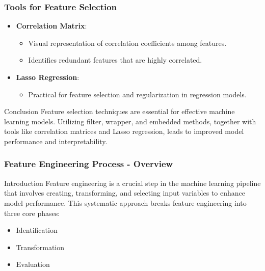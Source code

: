 \documentclass[aspectratio=169]{beamer}
\begin{document}
\begin{frame}[fragile]
    \frametitle{Tools for Feature Selection}
    \begin{itemize}
        \item \textbf{Correlation Matrix}:
            \begin{itemize}
                \item Visual representation of correlation coefficients among features.
                \item Identifies redundant features that are highly correlated.
            \end{itemize}
        
        \item \textbf{Lasso Regression}:
            \begin{itemize}
                \item Practical for feature selection and regularization in regression models.
            \end{itemize}
    \end{itemize}

    \begin{block}{Conclusion}
        Feature selection techniques are essential for effective machine learning models. Utilizing filter, wrapper, and embedded methods, together with tools like correlation matrices and Lasso regression, leads to improved model performance and interpretability.
    \end{block}
\end{frame}

\begin{frame}[fragile]
    \frametitle{Feature Engineering Process - Overview}
    \begin{block}{Introduction}
        Feature engineering is a crucial step in the machine learning pipeline that involves creating, transforming, and selecting input variables to enhance model performance.
        This systematic approach breaks feature engineering into three core phases:
        \begin{itemize}
            \item Identification
            \item Transformation
            \item Evaluation
        \end{itemize}
    \end{block}
\end{frame}
\end{document}
